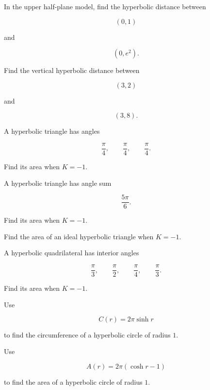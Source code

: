 \begin{exercise}[2]
In the upper half-plane model, find the hyperbolic distance between

\[
(0,1)
\]

and

\[
(0,e^2).
\]
\end{exercise}

\begin{exercise}[2]
Find the vertical hyperbolic distance between

\[
(3,2)
\]

and

\[
(3,8).
\]
\end{exercise}

\begin{exercise}[2]
A hyperbolic triangle has angles

\[
\frac{\pi}{4},
\qquad
\frac{\pi}{4},
\qquad
\frac{\pi}{4}.
\]

Find its area when \(K=-1\).
\end{exercise}

\begin{exercise}[2]
A hyperbolic triangle has angle sum

\[
\frac{5\pi}{6}.
\]

Find its area when \(K=-1\).
\end{exercise}

\begin{exercise}[2]
Find the area of an ideal hyperbolic triangle when \(K=-1\).
\end{exercise}

\begin{exercise}[2]
A hyperbolic quadrilateral has interior angles

\[
\frac{\pi}{3},
\qquad
\frac{\pi}{2},
\qquad
\frac{\pi}{4},
\qquad
\frac{\pi}{3}.
\]

Find its area when \(K=-1\).
\end{exercise}

\begin{exercise}[2]
Use

\[
C(r)=2\pi\sinh r
\]

to find the circumference of a hyperbolic circle of radius \(1\).
\end{exercise}

\begin{exercise}[2]
Use

\[
A(r)=2\pi(\cosh r-1)
\]

to find the area of a hyperbolic circle of radius \(1\).
\end{exercise}

